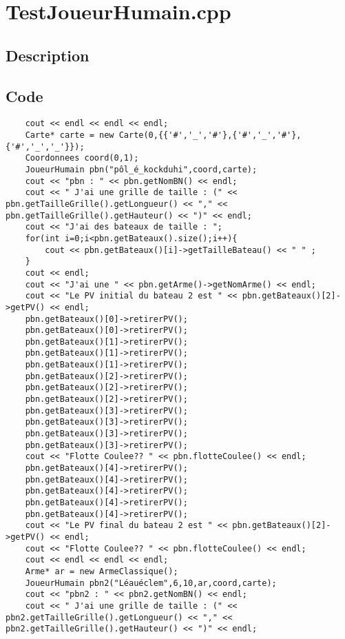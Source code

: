     \section{TestJoueurHumain.cpp}
        \subsection{Description}









        \subsection{Code}
\begin{lstlisting}
	cout << endl << endl << endl;
	Carte* carte = new Carte(0,{{'#','_','#'},{'#','_','#'},{'#','_','_'}});
	Coordonnees coord(0,1);
	JoueurHumain pbn("pôl_é_kockduhi",coord,carte);
	cout << "pbn : " << pbn.getNomBN() << endl;
	cout << " J'ai une grille de taille : (" << pbn.getTailleGrille().getLongueur() << "," << pbn.getTailleGrille().getHauteur() << ")" << endl;
	cout << "J'ai des bateaux de taille : ";
	for(int i=0;i<pbn.getBateaux().size();i++){
		cout << pbn.getBateaux()[i]->getTailleBateau() << " " ;
	}
	cout << endl;
	cout << "J'ai une " << pbn.getArme()->getNomArme() << endl;
	cout << "Le PV initial du bateau 2 est " << pbn.getBateaux()[2]->getPV() << endl;
	pbn.getBateaux()[0]->retirerPV();
	pbn.getBateaux()[0]->retirerPV();
	pbn.getBateaux()[1]->retirerPV();
	pbn.getBateaux()[1]->retirerPV();
	pbn.getBateaux()[1]->retirerPV();
	pbn.getBateaux()[2]->retirerPV();
	pbn.getBateaux()[2]->retirerPV();
	pbn.getBateaux()[2]->retirerPV();
	pbn.getBateaux()[3]->retirerPV();
	pbn.getBateaux()[3]->retirerPV();
	pbn.getBateaux()[3]->retirerPV();
	pbn.getBateaux()[3]->retirerPV();
	cout << "Flotte Coulee?? " << pbn.flotteCoulee() << endl;
	pbn.getBateaux()[4]->retirerPV();
	pbn.getBateaux()[4]->retirerPV();
	pbn.getBateaux()[4]->retirerPV();
	pbn.getBateaux()[4]->retirerPV();
	pbn.getBateaux()[4]->retirerPV();
	cout << "Le PV final du bateau 2 est " << pbn.getBateaux()[2]->getPV() << endl;
	cout << "Flotte Coulee?? " << pbn.flotteCoulee() << endl;
	cout << endl << endl << endl;
	Arme* ar = new ArmeClassique();
	JoueurHumain pbn2("Léauéclem",6,10,ar,coord,carte);
	cout << "pbn2 : " << pbn2.getNomBN() << endl;
	cout << " J'ai une grille de taille : (" << pbn2.getTailleGrille().getLongueur() << "," << pbn2.getTailleGrille().getHauteur() << ")" << endl;

\end{lstlisting}
